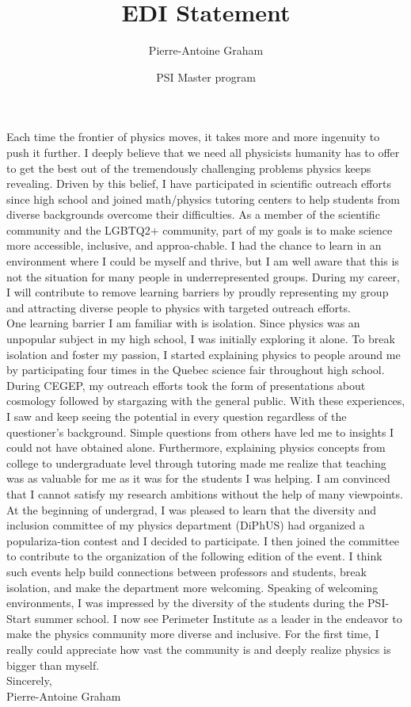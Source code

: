 \documentclass[12pt]{article}
\title{EDI Statement}
\author{Pierre-Antoine Graham}
\date{PSI Master program}
\begin{document}
\maketitle
\vspace{0.5cm}

Each time the frontier of physics moves, it takes more and more ingenuity to push it further. I deeply believe that we need all physicists humanity has to offer to get the best out of the tremendously challenging problems physics keeps revealing. Driven by this belief, I have participated in scientific outreach efforts since high school and joined math/physics tutoring centers to help students from diverse backgrounds overcome their difficulties. As a member of the scientific community and the LGBTQ2+ community, part of my goals is to make science more accessible, inclusive, and approa-chable. I had the chance to learn in an environment where I could be myself and thrive, but I am well aware that this is not the situation for many people in underrepresented groups. During my career, I will contribute to remove learning barriers by proudly representing my group and attracting diverse people to physics with targeted outreach efforts.\\

One learning barrier I am familiar with is isolation. Since physics was an unpopular subject in my high school, I was initially exploring it alone. To break isolation and foster my passion, I started explaining physics to people around me by participating four times in the Quebec science fair throughout high school. During CEGEP, my outreach efforts took the form of presentations about cosmology followed by stargazing with the general public. With these experiences, I saw and keep seeing the potential in every question regardless of the questioner's background. Simple questions from others have led me to insights I could not have obtained alone. Furthermore, explaining physics concepts from college to undergraduate level through tutoring made me realize that teaching was as valuable for me as it was for the students I was helping. I am convinced that I cannot satisfy my research ambitions without the help of many viewpoints.\\

At the beginning of undergrad, I was pleased to learn that the diversity and inclusion committee of my physics department (DiPhUS) had organized a populariza-tion contest and I decided to participate. I then joined the committee to contribute to the organization of the following edition of the event. I think such events help build connections between professors and students, break isolation, and make the department more welcoming. Speaking of welcoming environments, I was impressed by the diversity of the students during the PSI-Start summer school. I now see Perimeter Institute as a leader in the endeavor to make the physics community more diverse and inclusive. For the first time, I really could appreciate how vast the community is and deeply realize physics is bigger than myself.\\



Sincerely, \\

Pierre-Antoine Graham
\end{document}
